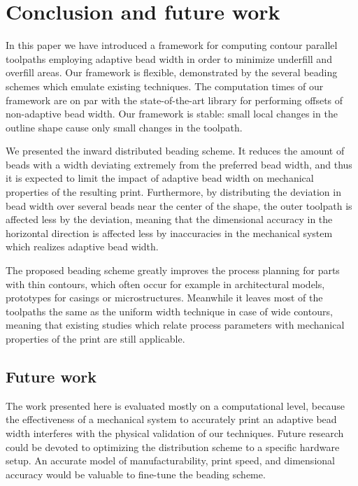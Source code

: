 \section{Conclusion and future work}
In this paper we have introduced a framework for computing contour parallel toolpaths employing adaptive bead width in order to minimize underfill and overfill areas.
Our framework is flexible, demonstrated by the several beading schemes which emulate existing techniques.
The computation times of our framework are on par with the state-of-the-art library for performing offsets of non-adaptive bead width.
Our framework is stable: small local changes in the outline shape cause only small changes in the toolpath.

We presented the inward distributed beading scheme.
It reduces the amount of beads with a width deviating extremely from the preferred bead width, and thus it is expected to limit the impact of adaptive bead width on mechanical properties of the resulting print.
Furthermore, by distributing the deviation in bead width over several beads near the center of the shape, the outer toolpath is affected less by the deviation, meaning that the dimensional accuracy in the horizontal direction is affected less by inaccuracies in the mechanical system which realizes adaptive bead width.

The proposed beading scheme greatly improves the process planning for parts with thin contours, which often occur for example in architectural models, prototypes for casings or microstructures.
Meanwhile it leaves most of the toolpaths the same as the uniform width technique in case of wide contours, meaning that existing studies which relate process parameters with mechanical properties of the print are still applicable.


\subsection{Future work}
The work presented here is evaluated mostly on a computational level, because the effectiveness of a mechanical system to accurately print an adaptive bead width interferes with the physical validation of our techniques.
Future research could be devoted to optimizing the distribution scheme to a specific hardware setup.
An accurate model of manufacturability, print speed, and dimensional accuracy would be valuable to fine-tune the beading scheme.

